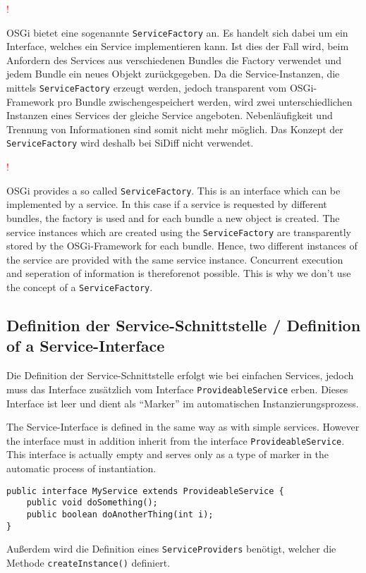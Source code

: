 \documentclass[10pt,a4paper]{scrartcl}
\newcommand{\hinweis}[1]{
\begin{framed}
\begin{minipage}[t]{0.02\textwidth}
\textcolor{red}{\Huge{\sffamily !}}
\end{minipage}
\begin{minipage}[t]{0.94\textwidth}
#1
\end{minipage}
\end{framed}
}
\providecommand{\deng}[2]{#1 / {\sffamily #2}}
\providecommand{\deutsch}[1]{#1}
\providecommand{\englisch}[1]{{\sffamily #1}}
\begin{document}
\deutsch{\hinweis{OSGi bietet eine sogenannte \texttt{ServiceFactory} an. Es
handelt sich dabei um ein Interface, welches ein Service implementieren kann.
Ist dies der Fall wird, beim Anfordern des Services aus verschiedenen Bundles
die Factory verwendet und jedem Bundle ein neues Objekt zurückgegeben. Da die
Service-Instanzen, die mittels \texttt{ServiceFactory} erzeugt werden, jedoch
transparent vom OSGi-Framework pro Bundle zwischengespeichert werden, wird zwei
unterschiedlichen Instanzen eines Services der gleiche Service angeboten.
Nebenläufigkeit und Trennung von Informationen sind somit nicht mehr möglich.
Das Konzept der \texttt{ServiceFactory} wird deshalb bei SiDiff nicht
verwendet.}}

\englisch{\hinweis{OSGi provides a so called \texttt{ServiceFactory}. This is an
interface which can be implemented by a service. In this case if a service is
requested by different bundles, the factory is used and for each bundle a new
object is created. The service instances which are created using the
\texttt{ServiceFactory} are transparently stored by the OSGi-Framework for each
bundle. Hence, two different instances of the service are provided with the same
service instance. Concurrent execution and seperation of information is
thereforenot possible. This is why we don't use the concept of a
\texttt{ServiceFactory}.}}


\subsection{\deng{Definition der Service-Schnittstelle}{Definition of a Service-Interface}}
\deutsch{Die Definition der Service-Schnittstelle erfolgt wie bei einfachen
Services, jedoch muss das Interface zusätzlich vom Interface
\texttt{ProvideableService} erben. Dieses Interface ist leer und dient als
``Marker'' im automatischen Instanzierungsprozess.}

\englisch{The Service-Interface is defined in the same way as with simple
services. However the interface must in addition inherit from the interface
\texttt{ProvideableService}. This interface is actually empty and serves only as
a type of marker in the automatic process of instantiation.}

\begin{lstlisting}
public interface MyService extends ProvideableService {
	public void doSomething();
	public boolean doAnotherThing(int i);
}
\end{lstlisting}

\deutsch{Außerdem wird die Definition eines \texttt{ServiceProviders} benötigt, welcher die Methode
\texttt{createInstance()} definiert.}
\end{document}

